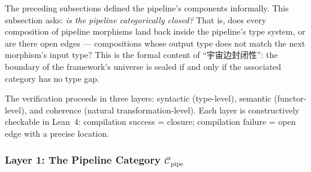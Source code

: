 \documentclass[11pt,a4paper]{article}
\theoremstyle{definition}
\theoremstyle{remark}
\begin{document}
The preceding subsections defined the pipeline's components informally. This subsection asks: \emph{is the pipeline categorically closed?} That is, does every composition of pipeline morphisms land back inside the pipeline's type system, or are there open edges --- compositions whose output type does not match the next morphism's input type? This is the formal content of ``宇宙边封闭性'': the boundary of the framework's universe is sealed if and only if the associated category has no type gap.

The verification proceeds in three layers: syntactic (type-level), semantic (functor-level), and coherence (natural transformation-level). Each layer is constructively checkable in Lean~4: compilation success = closure; compilation failure = open edge with a precise location.

\subsubsection*{Layer 1: The Pipeline Category $\mathcal{C}_{\mathrm{pipe}}$}
\end{document}
